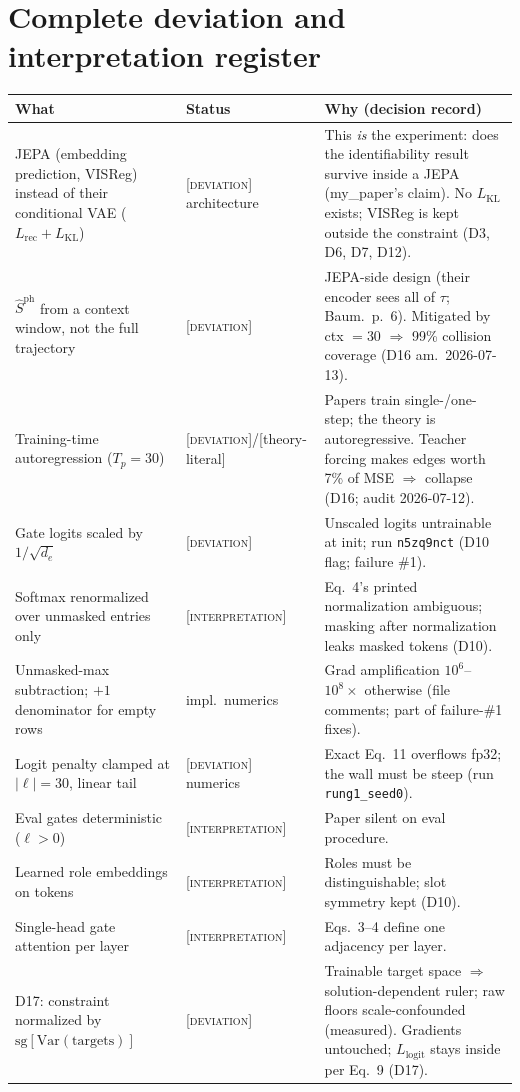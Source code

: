 \documentclass[11pt]{article}
\newcommand{\code}[1]{\texttt{\small #1}}
\newcommand{\paper}[1]{\textcolor{blue!60!black}{[#1]}}
\newcommand{\interp}{\textcolor{orange!80!black}{[\textsc{interpretation}]}}
\newcommand{\dev}{\textcolor{red!70!black}{[\textsc{deviation}]}}
\newcommand{\Sph}{\hat{S}^{\mathrm{ph}}}
\begin{document}
\section{Complete deviation and interpretation register}
\begin{longtable}{p{} p{} p{}}
\toprule
What & Status & Why (decision record) \\
\midrule
JEPA (embedding prediction, VISReg) instead of their conditional VAE ($L_{\mathrm{rec}} + L_{\mathrm{KL}}$) & \dev{} architecture & This \emph{is} the experiment: does the identifiability result survive inside a JEPA (my\_paper's claim). No $L_{\mathrm{KL}}$ exists; VISReg is kept outside the constraint (D3, D6, D7, D12). \\
$\Sph$ from a context window, not the full trajectory & \dev{} & JEPA-side design (their encoder sees all of $\tau$; Baum.\ p.~6). Mitigated by ctx $=30$ $\Rightarrow$ 99\% collision coverage (D16 am.\ 2026-07-13). \\
Training-time autoregression ($T_p{=}30$) & \dev{}/\paper{theory-literal} & Papers train single-/one-step; the theory is autoregressive. Teacher forcing makes edges worth 7\% of MSE $\Rightarrow$ collapse (D16; audit 2026-07-12). \\
Gate logits scaled by $1/\sqrt{d_e}$ & \dev{} & Unscaled logits untrainable at init; run \code{n5zq9nct} (D10 flag; failure \#1). \\
Softmax renormalized over unmasked entries only & \interp{} & Eq.~4's printed normalization ambiguous; masking after normalization leaks masked tokens (D10). \\
Unmasked-max subtraction; $+1$ denominator for empty rows & impl.\ numerics & Grad amplification $10^6$--$10^8\times$ otherwise (file comments; part of failure-\#1 fixes). \\
Logit penalty clamped at $|\ell|{=}30$, linear tail & \dev{} numerics & Exact Eq.~11 overflows fp32; the wall must be steep (run \code{rung1\_seed0}). \\
Eval gates deterministic ($\ell>0$) & \interp{} & Paper silent on eval procedure. \\
Learned role embeddings on tokens & \interp{} & Roles must be distinguishable; slot symmetry kept (D10). \\
Single-head gate attention per layer & \interp{} & Eqs.~3--4 define one adjacency per layer. \\
D17: constraint normalized by $\mathrm{sg}[\mathrm{Var}(\text{targets})]$ & \dev{} & Trainable target space $\Rightarrow$ solution-dependent ruler; raw floors scale-confounded (measured). Gradients untouched; $L_{\mathrm{logit}}$ stays inside per Eq.~9 (D17). \\

\end{longtable}
\end{document}
